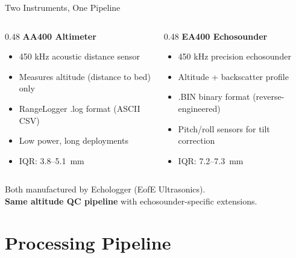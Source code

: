 \documentclass[10pt, aspectratio=169]{beamer}
\begin{document}
\begin{frame}{Two Instruments, One Pipeline}
  \begin{columns}[T]
    \begin{column}{0.48\textwidth}
      \textbf{AA400 Altimeter}
      \begin{itemize}
        \item 450 kHz acoustic distance sensor
        \item Measures altitude (distance to bed) only
        \item RangeLogger .log format (ASCII CSV)
        \item Low power, long deployments
        \item IQR: 3.8--5.1~mm
      \end{itemize}
    \end{column}
    \begin{column}{0.48\textwidth}
      \textbf{EA400 Echosounder}
      \begin{itemize}
        \item 450 kHz precision echosounder
        \item Altitude + backscatter profile
        \item .BIN binary format (reverse-engineered)
        \item Pitch/roll sensors for tilt correction
        \item IQR: 7.2--7.3~mm
      \end{itemize}
    \end{column}
  \end{columns}
  \vspace{1em}
  \centering
  Both manufactured by Echologger (EofE Ultrasonics). \\
  \textbf{Same altitude QC pipeline} with echosounder-specific extensions.
\end{frame}

\section{Processing Pipeline}
\end{document}
